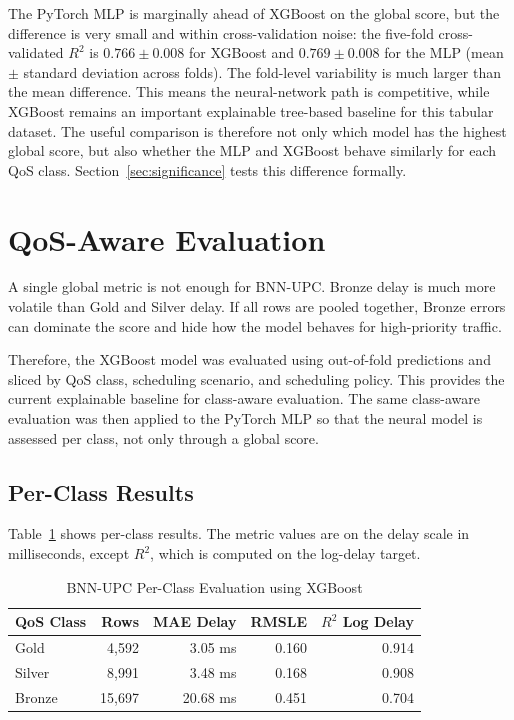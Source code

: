 \documentclass[a4paper,12pt]{Classes/RoboticsLaTeX}
\begin{document}
The PyTorch MLP is marginally ahead of XGBoost on the global score, but the difference is very small and within cross-validation noise: the five-fold cross-validated $R^2$ is $0.766 \pm 0.008$ for XGBoost and $0.769 \pm 0.008$ for the MLP (mean $\pm$ standard deviation across folds). The fold-level variability is much larger than the mean difference. This means the neural-network path is competitive, while XGBoost remains an important explainable tree-based baseline for this tabular dataset. The useful comparison is therefore not only which model has the highest global score, but also whether the MLP and XGBoost behave similarly for each QoS class. Section~\ref{sec:significance} tests this difference formally.

\section{QoS-Aware Evaluation}

A single global metric is not enough for BNN-UPC. Bronze delay is much more volatile than Gold and Silver delay. If all rows are pooled together, Bronze errors can dominate the score and hide how the model behaves for high-priority traffic.

Therefore, the XGBoost model was evaluated using out-of-fold predictions and sliced by QoS class, scheduling scenario, and scheduling policy. This provides the current explainable baseline for class-aware evaluation. The same class-aware evaluation was then applied to the PyTorch MLP so that the neural model is assessed per class, not only through a global score.

\subsection{Per-Class Results}

Table~\ref{tab:per_class_results} shows per-class results. The metric values are on the delay scale in milliseconds, except $R^2$, which is computed on the log-delay target.

\begin{table}[H]
\centering
\caption{BNN-UPC Per-Class Evaluation using XGBoost}
\label{tab:per_class_results}
\begin{tabular}{|l|r|r|r|r|}
\hline
\textbf{QoS Class} & \textbf{Rows} & \textbf{MAE Delay} & \textbf{RMSLE} & \textbf{$R^2$ Log Delay} \\
\hline
Gold & 4,592 & 3.05 ms & 0.160 & 0.914 \\
\hline
Silver & 8,991 & 3.48 ms & 0.168 & 0.908 \\
\hline
Bronze & 15,697 & 20.68 ms & 0.451 & 0.704 \\
\hline
\end{tabular}
\end{table}
\end{document}
